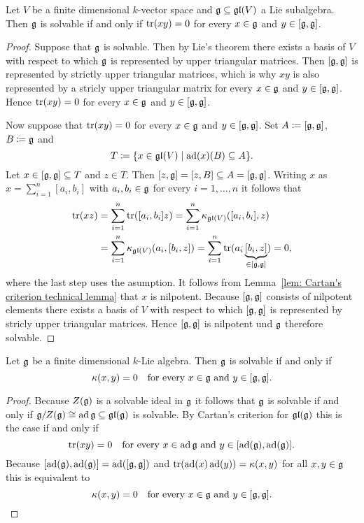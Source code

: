 \begin{lem}
 Let $V$ be a finite dimensional $k$-vector space and $\mathfrak{g} \subseteq \mathfrak{gl}(V)$ a Lie subalgebra. Then $\mathfrak{g}$ is solvable if and only if $\operatorname{tr}(xy) = 0$ for every $x \in \mathfrak{g}$ and $y \in [\mathfrak{g},\mathfrak{g}]$.
\end{lem}
\begin{proof}
 Suppose that $\mathfrak{g}$ is solvable. Then by Lie’s theorem there exists a basis of $V$ with respect to which $\mathfrak{g}$ is represented by upper triangular matrices. Then $[\mathfrak{g},\mathfrak{g}]$ is represented by strictly upper triangular matrices, which is why $xy$ is also represented by a stricly upper triangular matrix for every $x \in \mathfrak{g}$ and $y \in [\mathfrak{g},\mathfrak{g}]$. Hence $\operatorname{tr}(xy) = 0$ for every $x \in \mathfrak{g}$ and $y \in [\mathfrak{g},\mathfrak{g}]$.
 
 Now suppose that $\operatorname{tr}(xy) = 0$ for every $x \in \mathfrak{g}$ and $y \in [\mathfrak{g},\mathfrak{g}]$. Set $A \coloneqq [\mathfrak{g},\mathfrak{g}]$, $B \coloneqq \mathfrak{g}$ and
 \[
  T \coloneqq \{x \in \mathfrak{gl}(V) \mid \operatorname{ad}(x)(B) \subseteq A\}.
 \]
 Let $x \in [\mathfrak{g},\mathfrak{g}] \subseteq T$ and $z \in T$. Then $[z,\mathfrak{g}] = [z,B] \subseteq A = [\mathfrak{g},\mathfrak{g}]$. Writing $x$ as $x = \sum_{i=1}^n [a_i, b_i]$ with $a_i, b_i \in \mathfrak{g}$ for every $i = 1, \dotsc, n$ it follows that
 \begin{align*}
  \operatorname{tr}(xz)
  &= \sum_{i=1}^n \operatorname{tr}([a_i, b_i] z)
  = \sum_{i=1}^n \kappa_{\mathfrak{gl}(V)}([a_i, b_i], z) \\
  &= \sum_{i=1}^n \kappa_{\mathfrak{gl}(V)}(a_i, [b_i, z])
  = \sum_{i=1}^n \operatorname{tr}(a_i \underbrace{[b_i, z]}_{\in [\mathfrak{g},\mathfrak{g}]})
  = 0,
 \end{align*}
 where the last step uses the asumption. It follows from Lemma~\ref{lem: Cartan's criterion technical lemma} that $x$ is nilpotent. Because $[\mathfrak{g},\mathfrak{g}]$ consists of nilpotent elements there exists a basis of $V$ with respect to which $[\mathfrak{g},\mathfrak{g}]$ is represented by stricly upper triangular matrices. Hence $[\mathfrak{g},\mathfrak{g}]$ is nilpotent und $\mathfrak{g}$ therefore solvable.
\end{proof}



\begin{thrm}
 Let $\mathfrak{g}$ be a finite dimensional $k$-Lie algebra. Then $\mathfrak{g}$ is solvable if and only if
 \[
  \kappa(x,y) = 0 \quad \text{for every $x \in \mathfrak{g}$ and $y \in [\mathfrak{g},\mathfrak{g}]$}.
 \]
\end{thrm}
\begin{proof}
 Because $Z(\mathfrak{g})$ is a solvable ideal in $\mathfrak{g}$ it follows that $\mathfrak{g}$ is solvable if and only if $\mathfrak{g}/Z(\mathfrak{g}) \cong \operatorname{ad} \mathfrak{g} \subseteq \mathfrak{gl}(\mathfrak{g})$ is solvable. By Cartan’s criterion for $\mathfrak{gl}(\mathfrak{g})$ this is the case if and only if
 \[
  \operatorname{tr}(xy) = 0 \quad \text{for every $x \in \operatorname{ad} \mathfrak{g}$ and $y \in [\operatorname{ad}(\mathfrak{g}), \operatorname{ad}(\mathfrak{g})]$}.
 \]
 Because $[\operatorname{ad}(\mathfrak{g}), \operatorname{ad}(\mathfrak{g})] = \operatorname{ad}([\mathfrak{g},\mathfrak{g}])$ and $\operatorname{tr}(\operatorname{ad}(x)\operatorname{ad}(y)) = \kappa(x,y)$ for all $x,y \in \mathfrak{g}$ this is equivalent to
 \[
  \kappa(x,y) = 0 \quad \text{for every $x \in \mathfrak{g}$ and $y \in [\mathfrak{g},\mathfrak{g}]$}.
  \qedhere
 \]
\end{proof}














